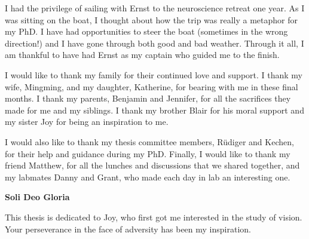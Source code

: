 \begin{frontmatter}
\begin{abstract}
\end{abstract}

\begin{acknowledgment}

I had the privilege of sailing with Ernst to the neuroscience retreat one year. As I was sitting on the boat, I thought about how the trip was really a metaphor for my PhD. I have had opportunities to steer the boat (sometimes in the wrong direction!) and I have gone through both good and bad weather. Through it all, I am thankful to have had Ernst as my captain who guided me to the finish.

I would like to thank my family for their continued love and support. I thank my wife, Mingming, and my daughter, Katherine, for bearing with me in these final months. I thank my parents, Benjamin and Jennifer, for all the sacrifices they made for me and my siblings. I thank my brother Blair for his moral support and my sister Joy for being an inspiration to me.

I would also like to thank my thesis committee members, R{\"u}diger and Kechen, for their help and guidance during my PhD. Finally, I would like to thank my friend Matthew, for all the lunches and discussions that we shared together, and my labmates Danny and Grant, who made each day in lab an interesting one.

\textbf{Soli Deo Gloria}

\vspace{-1cm} %

\end{acknowledgment}

\begin{dedication}
 
This thesis is dedicated to Joy, who first got me interested in the study of vision. Your perseverance in the face of adversity has been my inspiration.

\end{dedication}

\tableofcontents

\listoftables

\listoffigures

\end{frontmatter}

